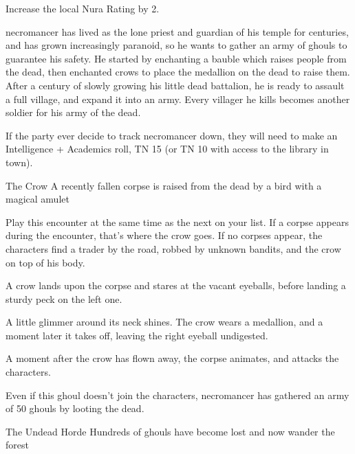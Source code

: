 \begin{multicols}{2}
Increase the local Nura Rating by 2.

\stopcontents[sq]

\resumecontents[Forest]

\label{necromancerspet}

\stopcontents[Forest]

\startcontents[sq]

\sqminitoc

\Gls{necromancer} has lived as the lone priest and guardian of his temple for centuries, and has grown increasingly paranoid, so he wants to gather an army of ghouls to guarantee his safety.
He started by enchanting a bauble which raises people from the dead, then enchanted crows to place the medallion on the dead to raise them.
After a century of slowly growing his little dead battalion, he is ready to assault a full village, and expand it into an army.
Every villager he kills becomes another soldier for his army of the dead.

If the party ever decide to track \gls{necromancer} down, they will need to make an Intelligence + Academics roll, TN 15 (or TN 10 with access to the library in town).

{The Crow}%
{A recently fallen corpse is raised from the dead by a bird with a magical amulet}%

Play this encounter at the same time as the next on your list.
If a corpse appears during the encounter, that's where the crow goes.
If no corpses appear, the characters find a trader by the road, robbed by unknown bandits, and the crow on top of his body.

\begin{boxtext}
	A crow lands upon the corpse and stares at the vacant eyeballs, before landing a sturdy peck on the left one.

	A little glimmer around its neck shines.  The crow wears a medallion, and a moment later it takes off, leaving the right eyeball undigested.

\end{boxtext}

A moment after the crow has flown away, the corpse animates, and attacks the characters.


Even if this ghoul doesn't join the characters, \gls{necromancer} has gathered an army of 50 ghouls by looting the dead.

{The Undead Horde}%
{Hundreds of ghouls have become lost and now wander the forest}%


\end{multicols}

